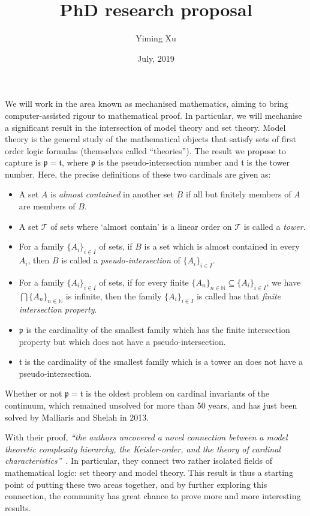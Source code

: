 \documentclass[11pt]{article}
\title{PhD research proposal}
\date{July, 2019}
\author{Yiming Xu}
\theoremstyle{definition}
\begin{document}
\maketitle
We will work in the area known as mechanised mathematics, aiming to bring computer-assisted rigour to mathematical proof. In particular, we will mechanise a significant result in the intersection of model theory and set theory. Model theory is the general study of the mathematical objects that satisfy sets of first order logic formulas (themselves called ``theories''). The result we propose to capture is $\mathfrak p= \mathfrak t$, where $\mathfrak p$ is the pseudo-intersection number and $\mathfrak t$ is the tower number. Here, the precise definitions of these two cardinals are given as:

\begin{itemize}
    \item A set  $A$ is \emph{almost contained} in another set $B$ if all but finitely members of $A$ are members of $B$. 
    \item A set $\mathcal T$ of sets where `almost contain' is a linear order on $\mathcal T$ is called a \emph{tower}.
    \item For a family $\{A_i\}_{i\in I}$ of sets, if $B$ is a set which is almost contained in every $A_i$, then $B$ is called a \emph{pseudo-intersection} of $\{A_i\}_{i\in I}$.
    \item For a family $\{A_i\}_{i\in I}$ of sets, if for every finite $\{A_n\}_{n\in\mathbb N}\subseteq \{A_i\}_{i\in I}$, we have $\bigcap \{A_n\}_{n\in\mathbb N}$ is infinite, then the family $\{A_i\}_{i\in I}$ is called has that \emph{finite intersection property}.
    \item $\mathfrak p$ is the cardinality of the smallest family which has the finite intersection property but which does not have a pseudo-intersection.
    \item $\mathfrak t$ is the cardinality of the smallest family which is a tower an does not have a pseudo-intersection.
\end{itemize}


Whether or not $\mathfrak p = \mathfrak t$ is the oldest problem on cardinal invariants of the continuum, which remained unsolved for more than 50 years, and has just been solved by Malliaris and Shelah in 2013.

With their proof, \textit{``the authors uncovered a novel connection between a model theoretic complexity hierarchy, the Keisler-order, and the theory of cardinal characteristics''}~\cite{Soukup2019}. In particular, they connect two rather isolated fields of mathematical logic: set theory and model theory. This result is thus a starting point of putting these two areas together, and by further exploring this connection, the community has great chance to prove more and more interesting results.
\end{document}
